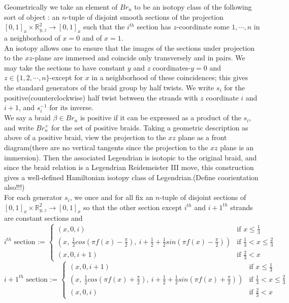 Geometrically we take an element of $Br_n$ to be an isotopy class of the following sort of object : an $n$-tuple of disjoint smooth sections of the projection $[0,1]_x \times \mathbb{R}^2_{y,z} \rightarrow [0,1]_x $ such that the $i^{th}$ section has $z$-coordinate some $1,\cdots ,n$ in a neighborhood of $x=0$ and of $x=1$.\\
An isotopy allows one to ensure that the images of the sections under projection to the $xz$-plane are immersed and coincide only transversely and in pairs. We may take the sections to have constant $y$ and $z$ coordinates-$y=0$ and $z\in \{1,2,\cdots,n\}$-except for $x$ in a neighborhood of these coincidences; this gives the standard generators of the braid group by half twists. We write $s_i$ for the positive(counterclockwise) half twist between the strands with $z$ coordinate $i$ and $i+1$, and $s_i^{-1}$ for its inverse.\\
We say a braid $\beta\in Br_n$ is positive if it can be expressed as a product of the $s_i$, and write $Br_n^+$ for the set of positive braids. Taking a geometric description as above of a positive braid, view the projection to the $xz$ plane as a front diagram(there are no vertical tangents since the projection to the $xz$ plane is an immersion). Then the associated Legendrian is isotopic to the original braid, and since the braid relation is a Legendrian Reidemeister \RN{3} move, this construction gives a well-defined Hamiltonian isotopy class of Legendrian.(Define coorientation also!!!)\\
For each generator $s_i$, we once and for all fix an $n$-tuple of disjoint sections of $[0,1]_x \times \mathbb{R}^2_{y,z} \rightarrow [0,1]_x$ so that the other section except $i^{th}$ and $i+1^{th}$ strands are constant sections and 
\[
i^{th}\text{ section := }
\begin{cases} 
    (x,0,i) & \text{if }x\leq \frac{1}{3} \\
    (x,~\frac{1}{2} cos(\pi f(x) - \frac{\pi}{2}),~i + \frac{1}{2} + \frac{1}{2}sin(\pi f(x) - \frac{\pi}{2})) & \text{if }\frac{1}{3} < x \leq \frac{2}{3} \\
    (x,0,i+1) & \text{if }\frac{2}{3} < x
\end{cases}
\]
\[
i+1^{th}\text{ section := }
\begin{cases} 
    (x,0,i+1) & \text{if }x\leq \frac{1}{3} \\
    (x,~\frac{1}{2} cos(\pi f(x) + \frac{\pi}{2}), ~i + \frac{1}{2} + \frac{1}{2}sin(\pi f(x) + \frac{\pi}{2})) & \text{if }\frac{1}{3} < x \leq \frac{2}{3} \\
    (x,0,i) & \text{if }\frac{2}{3} < x
\end{cases}
\]

